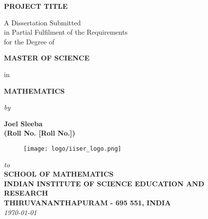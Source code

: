 \begin{titlepage}

\begin{center}

  \vfill

  \textbf{\Large PROJECT TITLE}\\[10pt]

  \vfill

  A Dissertation Submitted \\
  in Partial Fulfilment of the Requirements  \\
  for the Degree of  \\

  \vfill

  {\Large \bf MASTER OF SCIENCE }

  \vfill

  in

  \vfill

  {\large \bf MATHEMATICS }

  \vfill

  {\em  by} 

  \vfill

  {\large \bf Joel Sleeba} \\[0.3em] %
  {\large \bf (Roll No. [Roll No.])}\\[1em]

  \vfill

  \begin{figure}[h]
    \begin{center}
      \texttt{[image: logo/iiser\_logo.png]}
    \end{center}
  \end{figure}

  \vfill

  {\em\large to }\\[1em]
  {\bf\large SCHOOL OF MATHEMATICS} \\%
  {\bf\large INDIAN INSTITUTE OF SCIENCE EDUCATION AND RESEARCH}\\%
  {\bf\large THIRUVANANTHAPURAM - 695 551, INDIA}\\[1em]
  {\it\large \today }

\end{center}
\end{titlepage}

\clearpage


